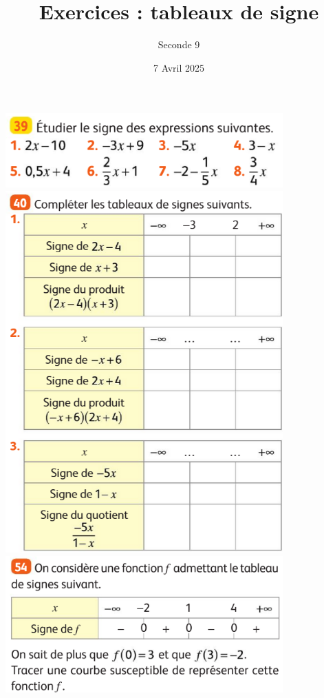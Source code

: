 \documentclass{article}
\title{Exercices : tableaux de signe}
\date{7 Avril 2025}
\author{Seconde 9}
\begin{document}
\maketitle
\begin{center}
\includegraphics[width=0.8\textwidth]{Exercice_2.png}
\includegraphics[width=0.8\textwidth]{Exercice_3.png}
\includegraphics[width=0.8\textwidth]{Exercice_4.png}
\end{center}
\end{document}
